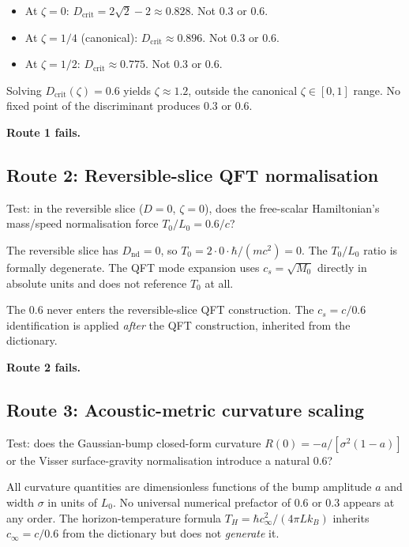 \documentclass[11pt,a4paper]{article}
\begin{document}
\begin{itemize}[noitemsep]
\item At $\zeta = 0$: $D_\mathrm{crit} = 2\sqrt{2} - 2 \approx 0.828$. Not 0.3 or 0.6.
\item At $\zeta = 1/4$ (canonical): $D_\mathrm{crit} \approx 0.896$. Not 0.3 or 0.6.
\item At $\zeta = 1/2$: $D_\mathrm{crit} \approx 0.775$. Not 0.3 or 0.6.
\end{itemize}

Solving $D_\mathrm{crit}(\zeta) = 0.6$ yields $\zeta \approx 1.2$, outside the canonical $\zeta \in [0,1]$ range. No fixed point of the discriminant produces 0.3 or 0.6.

\textbf{Route 1 fails.}

\subsection{Route 2: Reversible-slice QFT normalisation}

Test: in the reversible slice ($D = 0$, $\zeta = 0$), does the free-scalar Hamiltonian's mass/speed normalisation force $T_0/L_0 = 0.6/c$?

The reversible slice has $D_\mathrm{nd} = 0$, so $T_0 = 2 \cdot 0 \cdot \hbar/(mc^{2}) = 0$. The $T_0/L_0$ ratio is formally degenerate. The QFT mode expansion uses $c_s = \sqrt{M_0}$ directly in absolute units and does not reference $T_0$ at all.

The 0.6 never enters the reversible-slice QFT construction. The $c_s = c/0.6$ identification is applied \emph{after} the QFT construction, inherited from the dictionary.

\textbf{Route 2 fails.}

\subsection{Route 3: Acoustic-metric curvature scaling}

Test: does the Gaussian-bump closed-form curvature $R(0) = -a/[\sigma^{2} (1-a)]$ or the Visser surface-gravity normalisation introduce a natural 0.6?

All curvature quantities are dimensionless functions of the bump amplitude $a$ and width $\sigma$ in units of $L_0$. No universal numerical prefactor of 0.6 or 0.3 appears at any order. The horizon-temperature formula $T_H = \hbar c_\infty^{2} / (4\pi L k_B)$ inherits $c_\infty = c/0.6$ from the dictionary but does not \emph{generate} it.
\end{document}
